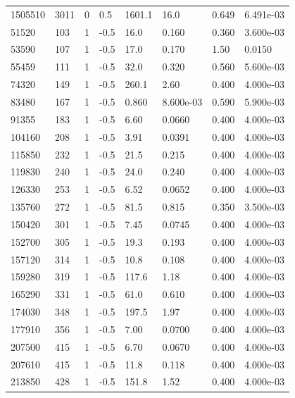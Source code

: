 \documentclass[preview]{standalone}
\begin{document}
{{{{{\begin{tabular}{L{1.2cm}C{1.2cm} C{0.3cm}C{0.5cm} C{1.4cm}C{1.4cm} C{1.4cm}C{1.4cm}}
  1505510  &  3011  & 0     & 0.5 &  1601.1  & 16.0  & 0.649 &  6.491e-03   \\ 
  51520  &   103  & 1     & -0.5 &  16.0  & 0.160  & 0.360 &  3.600e-03   \\ 
  53590  &   107  & 1     & -0.5 &  17.0  & 0.170  & 1.50 &  0.0150   \\ 
  55459  &   111  & 1     & -0.5 &  32.0  & 0.320  & 0.560 &  5.600e-03   \\ 
  74320  &   149  & 1     & -0.5 &  260.1  & 2.60  & 0.400 &  4.000e-03   \\ 
  83480  &   167  & 1     & -0.5 &  0.860  & 8.600e-03  & 0.590 &  5.900e-03   \\ 
  91355  &   183  & 1     & -0.5 &  6.60  & 0.0660  & 0.400 &  4.000e-03   \\ 
  104160  &   208  & 1     & -0.5 &  3.91  & 0.0391  & 0.400 &  4.000e-03   \\ 
  115850  &   232  & 1     & -0.5 &  21.5  & 0.215  & 0.400 &  4.000e-03   \\ 
  119830  &   240  & 1     & -0.5 &  24.0  & 0.240  & 0.400 &  4.000e-03   \\ 
  126330  &   253  & 1     & -0.5 &  6.52  & 0.0652  & 0.400 &  4.000e-03   \\ 
  135760  &   272  & 1     & -0.5 &  81.5  & 0.815  & 0.350 &  3.500e-03   \\ 
  150420  &   301  & 1     & -0.5 &  7.45  & 0.0745  & 0.400 &  4.000e-03   \\ 
  152700  &   305  & 1     & -0.5 &  19.3  & 0.193  & 0.400 &  4.000e-03   \\ 
  157120  &   314  & 1     & -0.5 &  10.8  & 0.108  & 0.400 &  4.000e-03   \\ 
  159280  &   319  & 1     & -0.5 &  117.6  & 1.18  & 0.400 &  4.000e-03   \\ 
  165290  &   331  & 1     & -0.5 &  61.0  & 0.610  & 0.400 &  4.000e-03   \\ 
  174030  &   348  & 1     & -0.5 &  197.5  & 1.97  & 0.400 &  4.000e-03   \\ 
  177910  &   356  & 1     & -0.5 &  7.00  & 0.0700  & 0.400 &  4.000e-03   \\ 
  207500  &   415  & 1     & -0.5 &  6.70  & 0.0670  & 0.400 &  4.000e-03   \\ 
  207610  &   415  & 1     & -0.5 &  11.8  & 0.118  & 0.400 &  4.000e-03   \\ 
  213850  &   428  & 1     & -0.5 &  151.8  & 1.52  & 0.400 &  4.000e-03   \\ 

\end{tabular}}}}}}
\end{document}
